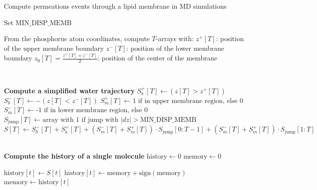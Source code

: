 \documentclass{article}
\begin{document}
\begin{algorithm}
    \caption{Compute permeations events through a lipid membrane in MD simulations}
    \begin{algorithmic}[1]
    
    \State Set \( \text{MIN\_DISP\_MEMB} \) 
    
    \State From the phosphorus atom coordinates, compute \( T \)-arrays with:
    \State \( z^{+}[T] \): position of the upper membrane boundary
    \State \( z^{-}[T] \): position of the lower membrane boundary
    \State \( z_{0}[T] = \frac{z^{+}[T] + z^{-}[T]}{2} \): position of the center of the membrane 

    \\

        \State \textbf{Compute a simplified water trajectory}
        \State \( S_{b}^{+}[T] \gets (z[T] > z^{+}[T]) \) 
        \State \( S_{b}^{-}[T] \gets - (z[T] < z^{-}[T]) \) 
        \State \( S_{m}^{+}[T] \gets \text{1 if in upper membrane region, else 0} \)
        \State \( S_{m}^{-}[T] \gets \text{-1 if in lower membrane region, else 0} \)
        \State \( S_{\text{jump}}[T] \gets \text{array with 1 if jump with } |dz| > \text{MIN\_DISP\_MEMB} \)
        \State \( S[T] \gets S_{b}^{-}[T] + S_{b}^{+}[T] + (S_{m}^{-}[T] + S_{m}^{+}[T]) \cdot S_{\text{jump}}[0:T-1] + (S_{m}^{-}[T] + S_{m}^{+}[T]) \cdot S_{\text{jump}}[1:T] \)

        \\

            \State \textbf{Compute the history of a single molecule}
            \State \( \text{history} \gets 0 \) 
            \State \( \text{memory} \gets 0 \) 
            
            \State \( \text{history}[t] \gets S[t] \)
             
                \State \( \text{history}[t] \gets \text{memory} + \text{sign}(\text{memory}) \) 
            \EndIf
            \State \( \text{memory} \gets \text{history}[t] \)
        \EndFor
            

\end{algorithmic}
\end{algorithm}
\end{document}
